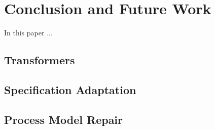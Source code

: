 \section{Conclusion and Future Work}

In this paper ...

\subsection{Transformers}

\subsection{Specification Adaptation}

\subsection{Process Model Repair}